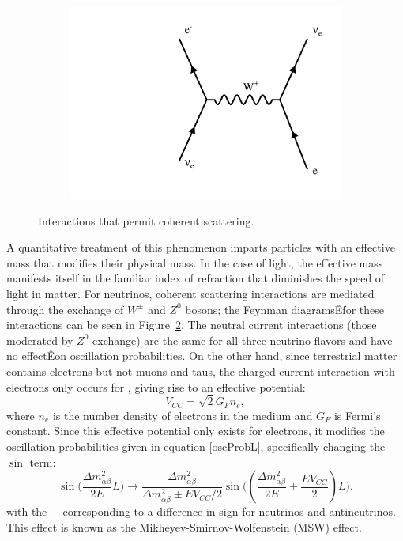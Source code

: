 \begin{figure}[t]
\begin{subfigure}[b]{0.3\textwidth}
                \includegraphics[width=\textwidth]{figures/feynman/ccElec.pdf}
                \caption{}
                 \label{ccElec}
        \end{subfigure}
\caption{Interactions that permit coherent scattering.}
\label{cohScatter}
\end{figure}
A quantitative treatment of this phenomenon imparts particles with an effective mass that modifies their physical mass.  In the case of light, the effective mass manifests itself in the familiar index of refraction that diminishes the speed of light in matter.  For neutrinos, coherent scattering interactions are mediated through the exchange of $W^\pm$ and $Z^0$ bosons; the Feynman diagramsÊfor these interactions can be seen in Figure~\ref{cohScatter}.  The neutral current interactions (those moderated by $Z^0$ exchange) are the same for all three neutrino flavors and have no effectÊon oscillation probabilities.  On the other hand, since terrestrial matter contains electrons but not muons and taus, the charged-current interaction with electrons only occurs for \nue, giving rise to an effective potential:
\begin{equation}
\label{veff}
V_{CC} = \sqrt{2}G_F n_e,
\end{equation}
where $n_e$ is the number density of electrons in the medium and $G_F$ is Fermi's constant.  Since this effective potential only exists for electrons, it modifies the oscillation probabilities given in equation \eqref{oscProbL}, specifically changing the $\sin$ term:
\begin{equation}
\label{modSin}
\sin\bigg(\frac{\Delta m_{\alpha\beta}^2}{2E}L\bigg) \rightarrow 
\frac{\Delta m_{\alpha\beta}^2}{\Delta m_{\alpha\beta}^2 \pm E V_{CC}/2} \sin\bigg((\frac{\Delta m_{\alpha\beta}^2}{2E} \pm \frac{EV_{CC}}{2})L \bigg).
\end{equation}
with the $\pm$ corresponding to a difference in sign for neutrinos and antineutrinos.  This effect is known as the Mikheyev-Smirnov-Wolfenstein (MSW) effect.

